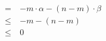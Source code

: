 \documentclass{article}
\newcommand{\stepandtag}{%
  \refstepcounter{equation}%
  \tag{\theequation}%
}
\newcommand{\piml}{\ensuremath{\pi_{ML}}}
\begin{document}
{\begin{align*}
    =\ & -m \cdot \alpha - (n - m) \cdot \beta \\
    \leq\ & -m -(n-m) \\
    \leq \ & 0

\end{align*}}
\end{document}
